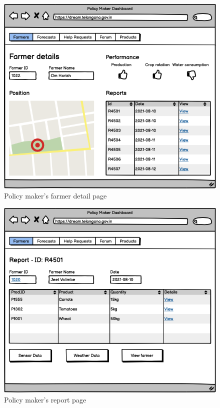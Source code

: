 \documentclass[10pt]{article} %
\begin{document}
\begin{figure}[h!]
    \centering
    \centerline{\includegraphics[scale=0.54]{images/uimockups/pm_farmerdetails.png}}
    \caption{Policy maker's farmer detail page}
    \label{fig:ui_pm_farmerdetails}
\end{figure}
\newpage

\begin{figure}[h!]
    \centering
    \centerline{\includegraphics[scale=0.54]{images/uimockups/pm_reports.png}}
    \caption{Policy maker's report page}
    \label{fig:ui_pm_reports}
\end{figure}
\newpage
\end{document}
